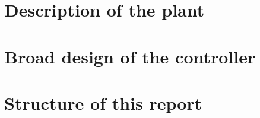 

\section{Description of the plant}

\section{Broad design of the controller}

\section{Structure of this report}